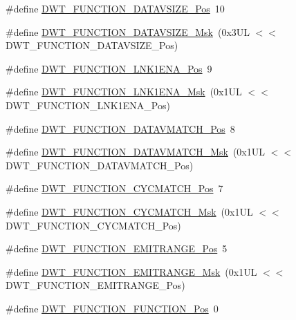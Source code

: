 \begin{DoxyCompactItemize}
\item 
\#define \hyperlink{group__CMSIS__DWT_ga0517a186d4d448aa6416440f40fe7a4d}{D\+W\+T\+\_\+\+F\+U\+N\+C\+T\+I\+O\+N\+\_\+\+D\+A\+T\+A\+V\+S\+I\+Z\+E\+\_\+\+Pos}~10
\item 
\#define \hyperlink{group__CMSIS__DWT_gaab42cbc1e6084c44d5de70971613ea76}{D\+W\+T\+\_\+\+F\+U\+N\+C\+T\+I\+O\+N\+\_\+\+D\+A\+T\+A\+V\+S\+I\+Z\+E\+\_\+\+Msk}~(0x3\+U\+L $<$$<$ D\+W\+T\+\_\+\+F\+U\+N\+C\+T\+I\+O\+N\+\_\+\+D\+A\+T\+A\+V\+S\+I\+Z\+E\+\_\+\+Pos)
\item 
\#define \hyperlink{group__CMSIS__DWT_ga89d7c48858b4d4de96cdadfac91856a1}{D\+W\+T\+\_\+\+F\+U\+N\+C\+T\+I\+O\+N\+\_\+\+L\+N\+K1\+E\+N\+A\+\_\+\+Pos}~9
\item 
\#define \hyperlink{group__CMSIS__DWT_ga64bd419260c3337cacf93607d1ad27ac}{D\+W\+T\+\_\+\+F\+U\+N\+C\+T\+I\+O\+N\+\_\+\+L\+N\+K1\+E\+N\+A\+\_\+\+Msk}~(0x1\+U\+L $<$$<$ D\+W\+T\+\_\+\+F\+U\+N\+C\+T\+I\+O\+N\+\_\+\+L\+N\+K1\+E\+N\+A\+\_\+\+Pos)
\item 
\#define \hyperlink{group__CMSIS__DWT_ga106f3672cd4be7c7c846e20497ebe5a6}{D\+W\+T\+\_\+\+F\+U\+N\+C\+T\+I\+O\+N\+\_\+\+D\+A\+T\+A\+V\+M\+A\+T\+C\+H\+\_\+\+Pos}~8
\item 
\#define \hyperlink{group__CMSIS__DWT_ga32af1f1c0fcd2d8d9afd1ad79cd9970e}{D\+W\+T\+\_\+\+F\+U\+N\+C\+T\+I\+O\+N\+\_\+\+D\+A\+T\+A\+V\+M\+A\+T\+C\+H\+\_\+\+Msk}~(0x1\+U\+L $<$$<$ D\+W\+T\+\_\+\+F\+U\+N\+C\+T\+I\+O\+N\+\_\+\+D\+A\+T\+A\+V\+M\+A\+T\+C\+H\+\_\+\+Pos)
\item 
\#define \hyperlink{group__CMSIS__DWT_ga4b65d79ca37ae8010b4a726312413efd}{D\+W\+T\+\_\+\+F\+U\+N\+C\+T\+I\+O\+N\+\_\+\+C\+Y\+C\+M\+A\+T\+C\+H\+\_\+\+Pos}~7
\item 
\#define \hyperlink{group__CMSIS__DWT_ga8e2ed09bdd33a8f7f7ce0444f5f3bb25}{D\+W\+T\+\_\+\+F\+U\+N\+C\+T\+I\+O\+N\+\_\+\+C\+Y\+C\+M\+A\+T\+C\+H\+\_\+\+Msk}~(0x1\+U\+L $<$$<$ D\+W\+T\+\_\+\+F\+U\+N\+C\+T\+I\+O\+N\+\_\+\+C\+Y\+C\+M\+A\+T\+C\+H\+\_\+\+Pos)
\item 
\#define \hyperlink{group__CMSIS__DWT_ga41d5b332216baa8d29561260a1b85659}{D\+W\+T\+\_\+\+F\+U\+N\+C\+T\+I\+O\+N\+\_\+\+E\+M\+I\+T\+R\+A\+N\+G\+E\+\_\+\+Pos}~5
\item 
\#define \hyperlink{group__CMSIS__DWT_gad46dd5aba29f2e28d4d3f50b1d291f41}{D\+W\+T\+\_\+\+F\+U\+N\+C\+T\+I\+O\+N\+\_\+\+E\+M\+I\+T\+R\+A\+N\+G\+E\+\_\+\+Msk}~(0x1\+U\+L $<$$<$ D\+W\+T\+\_\+\+F\+U\+N\+C\+T\+I\+O\+N\+\_\+\+E\+M\+I\+T\+R\+A\+N\+G\+E\+\_\+\+Pos)
\item 
\#define \hyperlink{group__CMSIS__DWT_ga5797b556edde2bbaa4d33dcdb1a891bb}{D\+W\+T\+\_\+\+F\+U\+N\+C\+T\+I\+O\+N\+\_\+\+F\+U\+N\+C\+T\+I\+O\+N\+\_\+\+Pos}~0
$$
\end{DoxyCompactItemize}
